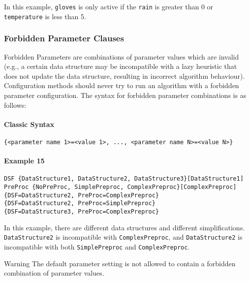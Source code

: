 \documentclass[manual.tex]{subfiles}
\begin{document}
In this example, \texttt{gloves} is only active if the \texttt{rain} is greater than 0 or \texttt{temperature} is less than 5.


\subsubsection{Forbidden Parameter Clauses}

Forbidden Parameters are combinations of parameter values which are invalid (e.g., a certain data structure may be incompatible with a lazy heuristic that does not update the data structure, resulting in incorrect algorithm behaviour).
%
Configuration methods should never try to run an algorithm with a forbidden parameter configuration. 
%
The syntax for forbidden parameter combinations is as follows:

\paragraph{Classic Syntax}

\begin{verbatim}
{<parameter name 1>=<value 1>, ..., <parameter name N>=<value N>}
\end{verbatim}

\paragraph{Example 15}
\begin{verbatim}
DSF {DataStructure1, DataStructure2, DataStructure3}[DataStructure1]
PreProc {NoPreProc, SimplePreproc, ComplexPreproc}[ComplexPreproc]
{DSF=DataStructure2, PreProc=ComplexPreproc}
{DSF=DataStructure2, PreProc=SimplePreproc}
{DSF=DataStructure3, PreProc=ComplexPreproc}
\end{verbatim}

In this example, there are different data structures and different simplifications.
\texttt{DataStructure2} is incompatible with \texttt{ComplexPreproc}, and 
\texttt{DataStructure2} is incompatible with both \texttt{SimplePreproc} and \texttt{ComplexPreproc}.

\begin{bclogo}[logo=\bcattention, couleurBarre=red, noborder=true]{Warning}
The default parameter setting is not allowed to contain a forbidden combination of parameter values.
\end{bclogo}
\end{document}

